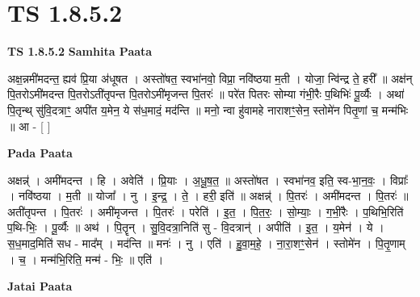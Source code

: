 \documentclass[17pt]{extarticle}
\begin{document}
\section*{ TS 1.8.5.2 }

\textbf{TS 1.8.5.2 } \newline
\textbf{Samhita Paata} \newline

अक्ष॒न्नमी॑मदन्त॒ ह्यव॑ प्रि॒या अ॑धूषत । अस्तो॑षत॒ स्वभा॑नवो॒ विप्रा॒ नवि॑ष्ठया म॒ती । योजा॒ न्वि॑न्द्र ते॒ हरी᳚ ॥ अक्ष॑न् पि॒तरोऽमी॑मदन्त पि॒तरोऽती॑तृपन्त पि॒तरोऽमी॑मृजन्त पि॒तरः॑ ॥ परे॑त पितरः सोम्या गंभी॒रैः प॒थिभिः॑ पू॒र्व्यैः । अथा॑ पि॒तृन्थ् सु॑वि॒दत्राꣳ॒॒ अपी॑त य॒मेन॒ ये स॑ध॒मादं॒ मद॑न्ति ॥ मनो॒ न्वा हु॑वामहे नाराशꣳ॒॒सेन॒ स्तोमे॑न पितृ॒णां च॒ मन्म॑भिः ॥ आ - [ ] \newline

\textbf{Pada Paata} \newline

अक्षन्न्॑ । अमी॑मदन्त । हि । अवेति॑ । प्रि॒याः । अ॒धू॒ष॒त॒ ॥ अस्तो॑षत । स्वभा॑नव॒ इति॒ स्व-भा॒न॒वः॒ । विप्राः᳚ । नवि॑ष्ठया । म॒ती ॥ योजा᳚ । नु । इ॒न्द्र॒ । ते॒ । हरी॒ इति॑ ॥ अक्षन्न्॑ । पि॒तरः॑ । अमी॑मदन्त । पि॒तरः॑ ॥ अती॑तृपन्त । पि॒तरः॑ । अमी॑मृजन्त । पि॒तरः॑ । परेति॑ । इ॒त॒ । पि॒त॒रः॒ । सो॒म्याः॒ । ग॒भीं॒रैः । प॒थिभि॒रिति॑ प॒थि-भिः॒ । पू॒र्व्यैः ॥ अथ॑ । पि॒तॄन् । सु॒वि॒दत्रा॒निति॑ सु - वि॒दत्रान्॑ । अपीति॑ । इ॒त॒ । य॒मेन॑ । ये । स॒ध॒माद॒मिति॑ सध - माद᳚म् । मद॑न्ति ॥ मनः॑ । नु । एति॑ । हु॒वा॒म॒हे॒ । ना॒रा॒शꣳ॒॒सेन॑ । स्तोमे॑न । पि॒तृ॒णाम् । च॒ । मन्म॑भि॒रिति॒ मन्म॑ - भिः॒ ॥ एति॑ ।  \newline



\textbf{Jatai Paata} \newline
\end{document}
